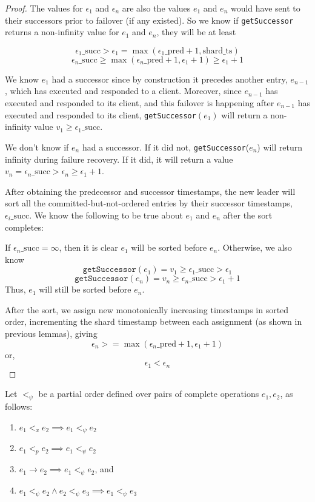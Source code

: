\begin{proof}
The values for $\epsilon_1$ and $\epsilon_n$ are also the values $e_1$ and $e_n$ would have sent to their successors prior to failover (if any existed). So we know if \texttt{getSuccessor} returns a non-infinity value for $e_1$ and $e_n$, they will be at least


$$\epsilon_1\_\text{succ} > \epsilon_1 = \max(\epsilon_1\_\text{pred} + 1, \text{shard\_ts})$$
$$\epsilon_n\_\text{succ} \geq \max(\epsilon_n\_\text{pred} + 1, \epsilon_1 + 1) \geq \epsilon_1 + 1$$

We know $e_1$ had a successor since by construction it precedes another entry, $e_{n-1}$, which has executed and responded to a client. Moreover, since $e_{n-1}$ has executed and responded to its client, and this failover is happening after $e_{n-1}$ has executed and responded to its client, \texttt{getSuccessor}$(e_1)$ will return a non-infinity value $v_1 \geq \epsilon_1\_\text{succ}$.

We don't know if $e_n$ had a successor. If it did not, \texttt{getSuccessor}($e_n$) will return infinity during failure recovery. If it did, it will return a value $v_n = \epsilon_n\_\text{succ} > \epsilon_n \geq \epsilon_1 + 1$.

After obtaining the predecessor and successor timestamps, the new leader will sort all the committed-but-not-ordered entries by their successor timestamps, $\epsilon_i\_\text{succ}$. We know the following to be true about $e_1$ and $e_n$ after the sort completes:

If $\epsilon_n\_\text{succ} = \infty$, then it is clear $e_1$ will be sorted before $e_n$. Otherwise, we also know 
$$\texttt{getSuccessor}(e_1) = v_1 \geq \epsilon_1\_\text{succ} > \epsilon_1$$
$$\texttt{getSuccessor}(e_n) = v_n \geq \epsilon_n\_\text{succ} > \epsilon_1 + 1$$
Thus, $e_1$ will still be sorted before $e_n$.

After the sort, we assign new monotonically increasing timestamps in sorted order, incrementing the shard timestamp between each assignment (as shown in previous lemmas), giving
$$\epsilon_n >= \max(\epsilon_n\_\text{pred} + 1, \epsilon_1 + 1)$$
or,
$$\epsilon_1 < \epsilon_n$$
\end{proof}

Let $<_\psi$ be a partial order defined over pairs of complete operations $e_1, e_2$, as follows:
\begin{enumerate}
    \item $e_1 <_x e_2 \implies e_1 <_\psi e_2$
    \item $e_1 <_p e_2 \implies e_1 <_\psi e_2$
    \item $e_1 \rightarrow e_2 \implies e_1 <_\psi e_2$, and
    \item $e_1 <_\psi e_2 \land e_2 <_\psi e_3 \implies e_1 <_\psi e_3$
\end{enumerate}

